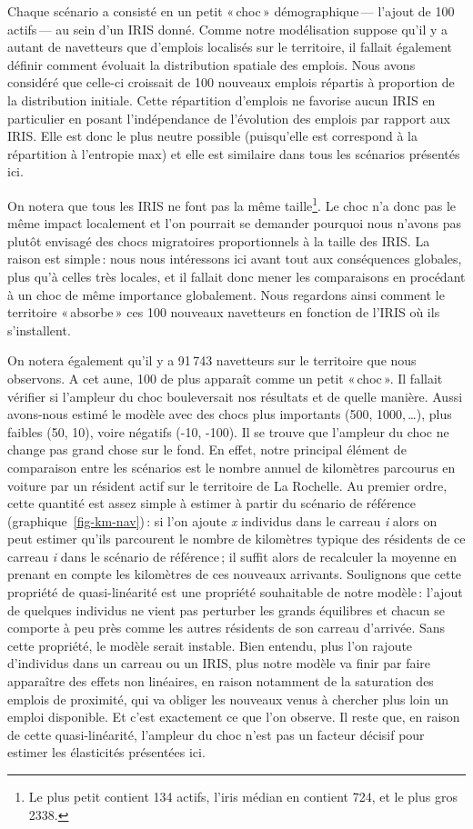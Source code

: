 \documentclass[
  9pt,
  a4paper,
  DIV=11]{scrreprt}
\begin{document}
Chaque scénario a consisté en un petit «\,choc\,» démographique\,---
l'ajout de 100 actifs\,--- au sein d'un IRIS donné. Comme notre
modélisation suppose qu'il y a autant de navetteurs que d'emplois
localisés sur le territoire, il fallait également définir comment
évoluait la distribution spatiale des emplois. Nous avons considéré que
celle-ci croissait de 100 nouveaux emplois répartis à proportion de la
distribution initiale. Cette répartition d'emplois ne favorise aucun
IRIS en particulier en posant l'indépendance de l'évolution des emplois
par rapport aux IRIS. Elle est donc le plus neutre possible (puisqu'elle
est correspond à la répartition à l'entropie max) et elle est similaire
dans tous les scénarios présentés ici.

On notera que tous les IRIS ne font pas la même taille\footnote{Le plus
  petit contient 134 actifs, l'iris médian en contient 724, et le plus
  gros 2338.}. Le choc n'a donc pas le même impact localement et l'on
pourrait se demander pourquoi nous n'avons pas plutôt envisagé des chocs
migratoires proportionnels à la taille des IRIS. La raison est simple\,:
nous nous intéressons ici avant tout aux conséquences globales, plus
qu'à celles très locales, et il fallait donc mener les comparaisons en
procédant à un choc de même importance globalement. Nous regardons ainsi
comment le territoire «\,absorbe\,» ces 100 nouveaux navetteurs en
fonction de l'IRIS où ils s'installent.

On notera également qu'il y a 91\,743 navetteurs sur le territoire que
nous observons. A cet aune, 100 de plus apparaît comme un petit
«\,choc\,». Il fallait vérifier si l'ampleur du choc bouleversait nos
résultats et de quelle manière. Aussi avons-nous estimé le modèle avec
des chocs plus importants (500, 1000,\,\ldots), plus faibles (50, 10),
voire négatifs (-10, -100). Il se trouve que l'ampleur du choc ne change
pas grand chose sur le fond. En effet, notre principal élément de
comparaison entre les scénarios est le nombre annuel de kilomètres
parcourus en voiture par un résident actif sur le territoire de La
Rochelle. Au premier ordre, cette quantité est assez simple à estimer à
partir du scénario de référence (graphique~\ref{fig-km-nav})\,: si l'on
ajoute \emph{x} individus dans le carreau \emph{i} alors on peut estimer
qu'ils parcourent le nombre de kilomètres typique des résidents de ce
carreau \emph{i} dans le scénario de référence\,; il suffit alors de
recalculer la moyenne en prenant en compte les kilomètres de ces
nouveaux arrivants. Soulignons que cette propriété de quasi-linéarité
est une propriété souhaitable de notre modèle\,: l'ajout de quelques
individus ne vient pas perturber les grands équilibres et chacun se
comporte à peu près comme les autres résidents de son carreau d'arrivée.
Sans cette propriété, le modèle serait instable. Bien entendu, plus l'on
rajoute d'individus dans un carreau ou un IRIS, plus notre modèle va
finir par faire apparaître des effets non linéaires, en raison notamment
de la saturation des emplois de proximité, qui va obliger les nouveaux
venus à chercher plus loin un emploi disponible. Et c'est exactement ce
que l'on observe. Il reste que, en raison de cette quasi-linéarité,
l'ampleur du choc n'est pas un facteur décisif pour estimer les
élasticités présentées ici.
\end{document}
